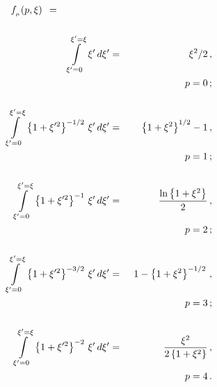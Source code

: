 \documentclass[usenatbib]{mn2e}
\numberwithin{equation}{section}
\begin{document}
\begin{eqnarray}\nonumber
f_{_\mu}(p,\xi)\;\,=\hspace{1.9cm}&&\\\nonumber&&\\\nonumber
\int\limits_{\xi'=0}^{\xi'=\xi}\,\xi'\,d\xi'&=&\xi^2/2\,,\\\nonumber
&&\hspace{2.0cm}p=0\,;\\\nonumber&&\\\nonumber
\int\limits_{\xi'=0}^{\xi'=\xi}\,\left\{1+\xi'^2\right\}^{-1/2}\,\xi'\,d\xi'&=&\left\{1+\xi^2\right\}^{1/2}-1\,,\\\nonumber
&&\hspace{2.0cm}p=1\,;\\\nonumber&&\\\nonumber
\int\limits_{\xi'=0}^{\xi'=\xi}\,\left\{1+\xi'^2\right\}^{-1}\,\xi'\,d\xi'&=&\frac{\ln\left\{1+\xi^2\right\}}{2}\,,\\\nonumber
&&\hspace{2.0cm}p=2\,;\\\nonumber&&\\\nonumber
\int\limits_{\xi'=0}^{\xi'=\xi}\,\left\{1+\xi'^2\right\}^{-3/2}\,\xi'\,d\xi'&=&1-\left\{1+\xi^2\right\}^{-1/2}\,,\\\nonumber
&&\hspace{2.0cm}p=3\,;\\\nonumber&&\\\nonumber
\int\limits_{\xi'=0}^{\xi'=\xi}\,\left\{1+\xi'^2\right\}^{-2}\,\xi'\,d\xi'&=&\frac{\xi^2}{2\left\{1+\xi^2\right\}}\,,\\\nonumber
&&\hspace{2.0cm}p=4\,.\\\nonumber&&\\\nonumber
\end{eqnarray}
\end{document}
